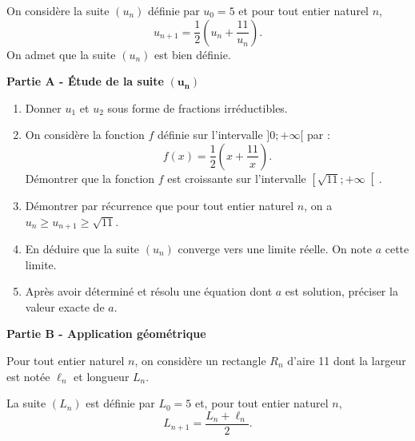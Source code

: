 On considère la suite $\left(u_{n}\right)$ définie par $u_{0}=5$ et pour tout entier naturel $n$, \[u_{n+1}=\frac{1}{2}\left(u_{n}+\frac{11}{u_{n}}\right).\]
%
On admet que la suite $\left(u_{n}\right)$ est bien définie.

\medskip

\textbf{Partie A - Étude de la suite} $\bm{\left(u_{n}\right)}$

\medskip

\begin{enumerate}
	\item Donner $u_{1}$ et $u_{2}$ sous forme de fractions irréductibles.
	\item On considère la fonction $f$ définie sur l'intervalle $]0 ; +\infty [$ par : \[f(x)=\frac{1}{2}\left(x+\frac{11}{x}\right).\]
	Démontrer que la fonction $f$ est croissante sur l'intervalle $\left[\sqrt{11};+\infty\right[$.
	\item Démontrer par récurrence que pour tout entier naturel $n$, on a $u_{n} \geqslant u_{n+1} \geqslant \sqrt{11}$.
	\item En déduire que la suite $\left(u_{n}\right)$ converge vers une limite réelle. On note $a$ cette limite.
	\item Après avoir déterminé et résolu une équation dont $a$ est solution, préciser la valeur exacte de $a$.
\end{enumerate}

\medskip

\textbf{Partie B - Application géométrique}

\medskip

Pour tout entier naturel $n$, on considère un rectangle $R_{n}$ d'aire 11 dont la largeur est notée $\ell_{n}$ et longueur $L_{n}$.

La suite $\left(L_{n}\right)$ est définie par $L_{0}=5$ et, pour tout entier naturel $n$, \[L_{n+1}=\frac{L_{n}+\ell_{n}}{2}.\]

